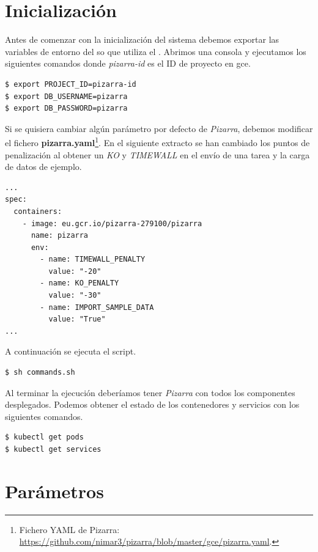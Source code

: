 \documentclass[11pt,spanish,listoffigures,listoftables]{tfgetsinf}
\begin{document}
\section{Inicialización}

Antes de comenzar con la inicialización del sistema debemos exportar las variables de entorno del \acrshort{so} que utiliza el . Abrimos una consola y ejecutamos los siguientes comandos donde \textit{pizarra-id} es el ID de proyecto en \acrfull{gce}.

\begin{lstlisting}[style=ascii-tree]
$ export PROJECT_ID=pizarra-id
$ export DB_USERNAME=pizarra
$ export DB_PASSWORD=pizarra
\end{lstlisting}

Si se quisiera cambiar algún parámetro por defecto de \textit{Pizarra}, debemos modificar el fichero \textbf{pizarra.yaml}\footnote{Fichero YAML de Pizarra: \url{https://github.com/nimar3/pizarra/blob/master/gce/pizarra.yaml}.}. En el siguiente extracto se han cambiado los puntos de penalización al obtener un \textit{KO} y \textit{TIMEWALL} en el envío de una \Gls{tarea} y la carga de datos de ejemplo.

\begin{lstlisting}[style=ascii-tree]
...
spec:
  containers:
    - image: eu.gcr.io/pizarra-279100/pizarra
      name: pizarra
      env:
        - name: TIMEWALL_PENALTY
          value: "-20"
        - name: KO_PENALTY
          value: "-30"
        - name: IMPORT_SAMPLE_DATA
          value: "True"
...          
\end{lstlisting}

A continuación se ejecuta el script.

\begin{lstlisting}[style=ascii-tree]
$ sh commands.sh
\end{lstlisting}

Al terminar la ejecución deberíamos tener \textit{Pizarra} con todos los componentes desplegados. Podemos obtener el estado de los \gls{contenedor}es y servicios con los siguientes comandos.

\begin{lstlisting}[style=ascii-tree]
$ kubectl get pods
$ kubectl get services
\end{lstlisting}

\section{Parámetros}
\end{document}
